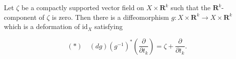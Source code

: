Let $\zeta$ be a compactly supported vector field on $X \times \mathbf{R}^k$ such that the $\mathbf{R}^k$-component of $\zeta$ is zero. Then there is a diffeomorphism $g: X \times \mathbf{R}^k \rightarrow X \times \mathbf{R}^k$ which is a deformation of $\text{id}_X$ satisfying

$$(*) \quad (dg)(g^{-1})^*\left(\frac{\partial}{\partial t_k}\right) = \zeta + \frac{\partial}{\partial t_k}.$$
